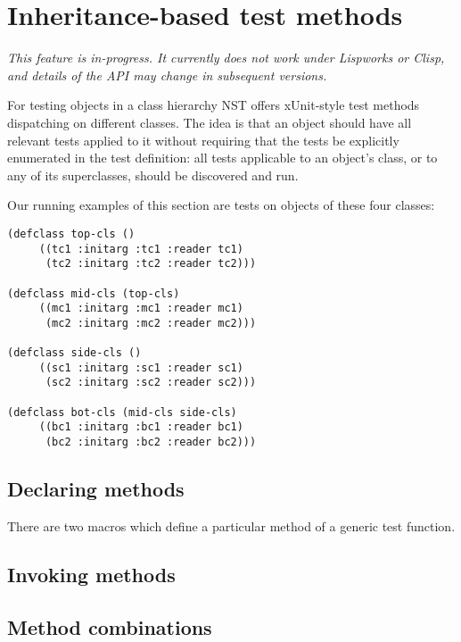 
\section{Inheritance-based test methods}
\label{sec:methods}
\emph{This feature is in-progress. It currently does not work under Lispworks or Clisp, and details of the API may change in subsequent versions.}

For testing objects in a class hierarchy NST offers xUnit-style test
methods dispatching on different classes.  The idea is that an object
should have all relevant tests applied to it without requiring that
the tests be explicitly enumerated in the test definition: all tests
applicable to an object's class, or to any of its superclasses, should
be discovered and run.

Our running examples of this section are tests on objects of these
four classes:
\begin{verbatim}
(defclass top-cls ()
     ((tc1 :initarg :tc1 :reader tc1)
      (tc2 :initarg :tc2 :reader tc2)))

(defclass mid-cls (top-cls)
     ((mc1 :initarg :mc1 :reader mc1)
      (mc2 :initarg :mc2 :reader mc2)))

(defclass side-cls ()
     ((sc1 :initarg :sc1 :reader sc1)
      (sc2 :initarg :sc2 :reader sc2)))

(defclass bot-cls (mid-cls side-cls)
     ((bc1 :initarg :bc1 :reader bc1)
      (bc2 :initarg :bc2 :reader bc2)))
\end{verbatim}

\subsection{Declaring methods}


There are two macros which define a particular method of a generic
test function.



\subsection{Invoking methods}


\subsection{Method combinations}


